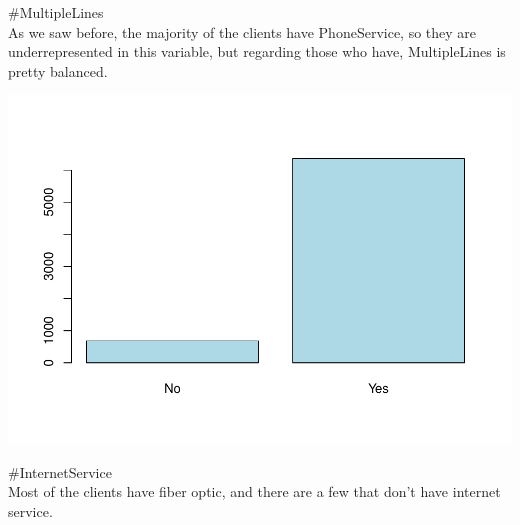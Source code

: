 \documentclass[
]{article}
\newenvironment{Shaded}{\begin{snugshade}}{\end{snugshade}}
\newcommand{\AttributeTok}[1]{\textcolor[rgb]{0.13,0.29,0.53}{#1}}
\newcommand{\CommentTok}[1]{\textcolor[rgb]{0.56,0.35,0.01}{\textit{#1}}}
\newcommand{\FunctionTok}[1]{\textcolor[rgb]{0.13,0.29,0.53}{\textbf{#1}}}
\newcommand{\NormalTok}[1]{#1}
\newcommand{\OtherTok}[1]{\textcolor[rgb]{0.56,0.35,0.01}{#1}}
\newcommand{\SpecialCharTok}[1]{\textcolor[rgb]{0.81,0.36,0.00}{\textbf{#1}}}
\newcommand{\StringTok}[1]{\textcolor[rgb]{0.31,0.60,0.02}{#1}}
\begin{document}
\#MultipleLines\\
As we saw before, the majority of the clients have PhoneService, so they
are underrepresented in this variable, but regarding those who have,
MultipleLines is pretty balanced.

\begin{Shaded}
\end{Shaded}

\includegraphics{Assignment2_script_files/figure-latex/unnamed-chunk-12-1.pdf}

\#InternetService\\
Most of the clients have fiber optic, and there are a few that don't
have internet service.

\begin{Shaded}
\end{Shaded}
\end{document}
